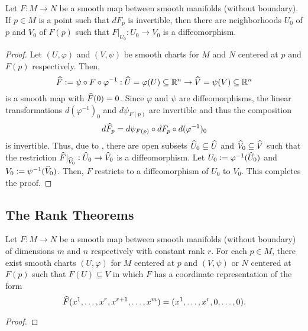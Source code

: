 \begin{theorem}
    Let $F:M\to N$ be a smooth map between smooth manifolds (without boundary). If $p\in M$ is a point such that $dF_p$ is invertible, then there are neighborhoods $U_0$ of $p$ and $V_0$ of $F(p)$ such that $F|_{U_0}: U_0\to V_0$ is a diffeomorphism.
\end{theorem}
\begin{proof}
    Let $(U,\varphi)$ and $(V,\psi)$ be smooth charts for $M$ and $N$ centered at $p$ and $F(p)$ respectively. Then, 
    \begin{equation*}
        \widehat{F} := \psi\circ F\circ\varphi^{-1}: \widehat{U} = \varphi(U)\subseteq\mathbb{R}^n\to\widehat{V} = \psi(V)\subseteq\mathbb{R}^n
    \end{equation*}
    is a smooth map with $\widehat{F}(0) = 0$. Since $\varphi$ and $\psi$ are diffeomorphisms, the linear transformations $d(\varphi^{-1})_0$ and $d\psi_{F(p)}$ are invertible and thus the composition 
    \begin{equation*}
        d\widehat{F}_p = d\psi_{F(p)}\circ dF_p\circ d(\varphi^{-1})_0
    \end{equation*}
    is invertible. Thus, due to , there are open subsets $\widehat{U}_0\subseteq\widehat{U}$ and $\widehat{V}_0\subseteq\widehat{V}$ such that the restriction $\widehat{F}|_{\widehat{V}_0}: \widehat{U}_0\to\widehat{V}_0$ is a diffeomorphism. Let $U_0 := \varphi^{-1}(\widehat{U}_0)$ and $V_0 := \psi^{-1}(\widehat{V}_0)$. Then, $F$ restricts to a diffeomorphism of $U_0$ to $V_0$. This completes the proof.
\end{proof}

\subsection{The Rank Theorems}

\begin{theorem}
    Let $F: M\to N$ be a smooth map between smooth manifolds (without boundary) of dimensions $m$ and $n$ respectively with constant rank $r$. For each $p\in M$, there exist smooth charts $(U,\varphi)$ for $M$ centered at $p$ and $(V,\psi)$ or $N$ centered at $F(p)$ such that $F(U)\subseteq V$ in which $F$ has a coordinate representation of the form 
    \begin{equation*}
        \widehat{F}(x^1,\dots,x^r,x^{r + 1},\dots,x^m) = (x^1,\dots,x^r,0,\dots,0).
    \end{equation*}
\end{theorem}
\begin{proof}
    
\end{proof}


